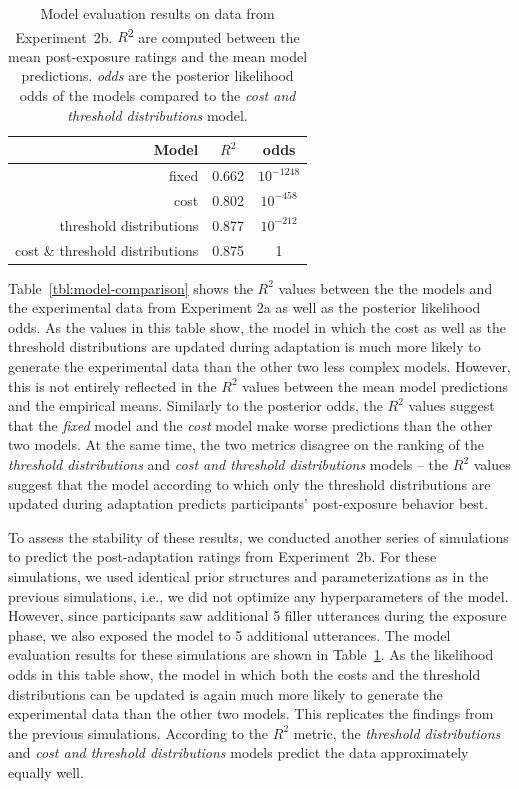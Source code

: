 \documentclass[man, floatsintext]{apa6}
\begin{document}
\begin{table}
\center
\begin{tabular}{r | c | c }
Model & $R^2$ &   odds  \\ \midrule
fixed & 0.662 & $10^{-1248}$    \\
cost & 0.802 &  $10^{-458}$  \\
threshold distributions & 0.877 & $10^{-212}$  \\
cost \& threshold distributions & 0.875 & 1 \\
\end{tabular}
\caption{Model evaluation results on data from Experiment~2b.  $R$\textsuperscript{$2$} are computed between  the mean post-exposure ratings and the mean model predictions. \textit{odds} are the posterior likelihood odds of the models compared to the \textit{cost and threshold distributions} model.  \label{tbl:model-comparison-replication}}
\end{table}

Table~\ref{tbl:model-comparison} shows the $R^2$ values between the the models and the experimental data from Experiment 2a 
as well as the posterior likelihood odds. As the values in this table show, the model in which the cost as well as the threshold 
 distributions are updated during adaptation is much more likely to generate the experimental data than the other 
 two less complex models. However, this is not entirely reflected in the $R^2$ values between the mean model predictions
 and the empirical means. Similarly to the posterior odds, the $R^2$ values suggest that the \textit{fixed} model
 and the \textit{cost} model make worse predictions than the other two models. At the same time, the two metrics disagree on the 
 ranking of the \textit{threshold distributions} and \textit{cost and threshold distributions} models -- the $R^2$ values suggest
 that the model according to which only the threshold distributions are updated during adaptation predicts 
 participants' post-exposure behavior best.
 
 To assess the stability of these results, we conducted another series of simulations to predict the post-adaptation
 ratings from Experiment~2b. For these simulations, we used identical prior structures and parameterizations as in
 the previous simulations, i.e., we did not optimize any hyperparameters of the model. However, 
 since participants saw additional 5 filler utterances during the exposure phase, we also exposed the model to 5 additional utterances. 
 The model 
evaluation results for these simulations are shown in Table~\ref{tbl:model-comparison-replication}. As the likelihood odds
in this table show, the model in which both the costs and the threshold distributions can be updated is again much more
likely to generate the experimental data than the other two models. This replicates the findings from the previous simulations.
According to the $R^2$ metric, the \textit{threshold distributions} and \textit{cost and threshold distributions} models predict
the data approximately equally well.
\end{document}
